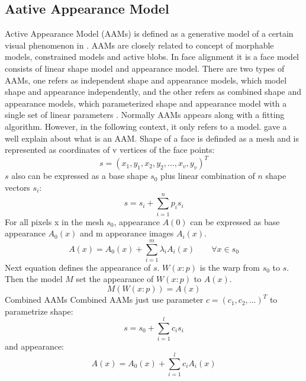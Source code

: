 \subsection{Aative Appearance Model}

Active Appearance Model (AAMs) is defined as a generative model of a certain visual phenomenon in \cite{matthews2004active}. AAMs are closely related to concept of morphable models, constrained models and active blobs. In face alignment it is a face model consists of linear shape model and appearance model. There are two types of AAMs, one refers as independent shape and appearance models, which model shape and appearance independently, and the other refers as combined shape and appearance models, which parameterized shape and appearance model with a single set of linear parameters \cite{matthews2004active}. Normally AAMs appears along with a fitting algorithm. However, in the following context, it only refers to a model.\cite{matthews2004active} gave a well explain about what is an AAM.\newline
Shape of a face is definded as a mesh and is represented as coordinates of v vertices of the face points:
\begin{equation}
s = (x_{1},y_{1},x_{2},y_{2},...,x_{v},y_{v})^{T}
\end{equation}
\newline
$s$ also can be expressed as a base shape $s_{0}$ plus linear combination of $n$ shape vectors $s_{i}$:
\begin{equation}
s = s_{i} + \sum_{i =1}^{n}p_{i}s_{i}
\end{equation}
\newline
For all pixels x in the mesh $s_{0}$, appearance $A(0)$ can be expressed as base appearance $A_{0}(x)$ and m appearance images $A_{i}(x)$.
\begin{equation}
A(x) = A_{0}(x) + \sum_{i=1}^{m}\lambda_{i}A_{i}(x) \qquad \forall x \in s_{0}
\end{equation}
\newline
Next equation defines the appearance of $s$. $W(x:p)$ is the warp from $s_{0}$ to $s$. Then the model $M$ set the appearance of $W(x:p)$ to $A(x)$.
\begin{equation}
M(W(x:p)) = A(x)
\end{equation}
\newline
Combined AAMs
\newline
Combined AAMs just use parameter $c = (c_{1},c_{2},...)^{T}$ to parametrize shape:
\begin{equation}
s = s_{0} + \sum_{i=1}^{l}c_{i}s_{i}
\end{equation}
and appearance:
\begin{equation}
A(x) = A_{0}(x) + \sum_{i=1}^{l}c_{i}A_{i}(x)
\end{equation}

